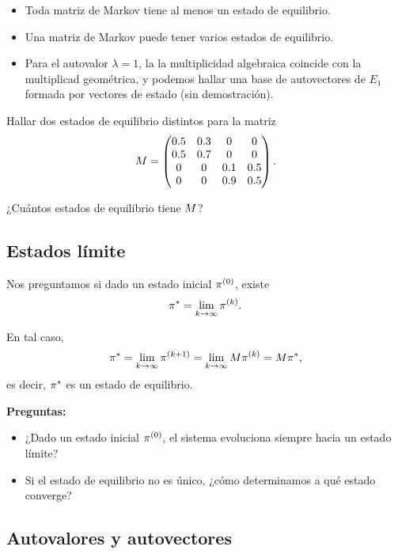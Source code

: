 \begin{itemize}
\item Toda matriz de Markov tiene al menos un estado de equilibrio.
\item Una matriz de Markov puede tener varios estados de equilibrio.
\item Para el autovalor $\lambda = 1$, la la multiplicidad algebraica coincide con la multiplicad geométrica, y podemos hallar una base de autovectores de $E_1$ formada por vectores de estado (sin demostración).
\end{itemize}


\begin{ejercicio} Hallar dos estados de equilibrio distintos para la matriz
$$
\Mb = \begin{pmatrix}
0.5 & 0.3 & 0   & 0   \\
0.5 & 0.7 & 0   & 0   \\
0   & 0   & 0.1 & 0.5 \\
0   & 0   & 0.9 & 0.5 \\
\end{pmatrix}.
$$

¿Cuántos estados de equilibrio tiene $\Mb$?
\end{ejercicio}

\subsection{Estados límite}

Nos preguntamos si dado un estado inicial $\pib^{(0)}$, existe
$$
\pib^* = \lim_{k \rightarrow \infty} \pib^{(k)}.
$$

En tal caso,
$$
\pib^* = \lim_{k \rightarrow \infty} \pib^{(k+1)} = \lim_{k \rightarrow \infty} \Mb \pib^{(k)} = \Mb \pib^*,
$$
es decir, $\pib^*$ es un estado de equilibrio.

\textbf{Preguntas:}

\begin{itemize}
\item ¿Dado un estado inicial $\pib^{(0)}$, el sistema evoluciona siempre hacia un estado límite?
\item Si el estado de equilibrio no es único, ¿cómo determinamos a qué estado converge?
\end{itemize}

\subsection{Autovalores y autovectores}

